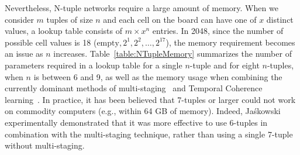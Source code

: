 Nevertheless, N-tuple networks require a large amount of memory.
When we consider $m$ tuples of size $n$ and each cell on the board can have one of $x$ distinct values, a lookup table consists of $m \times x^n$ entries.
In 2048, since the number of possible cell values is 18 ($\mbox{empty}, 2^1, 2^2, \ldots, 2^{17}$), the memory requirement becomes an issue as $n$ increases.
Table~\ref{table:NTupleMemory} summarizes the number of parameters required in a lookup table for a single $n$-tuple and for eight $n$-tuples, when $n$ is between 6 and 9, as well as the memory usage when combining the currently dominant methods of multi-staging~\cite{YWHC16} and Temporal Coherence learning~\cite{Jask18}.
In practice, it has been believed that 7-tuples or larger could not work on commodity computers (e.g., within 64 GB of memory).
Indeed, Ja\'skowski~\cite{Jask18} experimentally demonstrated that it was more effective to use 6-tuples in combination with the multi-staging technique, rather than using a single 7-tuple without multi-staging.

